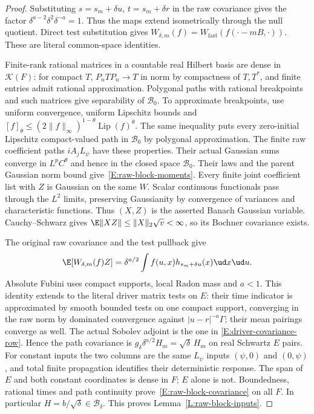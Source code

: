 \begin{proof}
  Substituting $s=s_m+\delta u$, $t=s_m+\delta r$ in the raw
  covariance gives the factor
  $\delta^{a-2}\delta^2\delta^{-a}=1$.
  Thus the maps extend isometrically through the null quotient.
  Direct test substitution gives
  $W_{\delta,m}(f)=W_{\mathrm{fast}}(f(\cdot-mB,\cdot))$.
  These are literal common-space identities.

  Finite-rank rational matrices in a countable real Hilbert basis
  are dense in $\mathcal K(F)$: for compact $T$,
  $P_nTP_n\to T$ in norm by compactness of $T,T^*$, and finite
  entries admit rational approximation. Polygonal paths with rational
  breakpoints and such matrices give separability of $\mathscr B_0$.
  To approximate breakpoints, use uniform convergence, uniform
  Lipschitz bounds and
  $[f]_\theta\le(2\|f\|_\infty)^{1-\theta}\operatorname{Lip}(f)^\theta$.
  The same inequality puts every zero-initial Lipschitz
  compact-valued path in $\mathscr B_0$ by polygonal approximation.
  The finite raw coefficient paths $iA_jL_\psi$ have these properties.
  Their actual Gaussian sums converge in $L^pC^\theta$ and hence
  in the closed space $\mathscr B_0$. Their laws and the parent
  Gaussian norm bound give~\eqref{E:raw-block-moments}.
  Every finite joint coefficient list with $Z$ is Gaussian on the
  same $W$. Scalar continuous functionals pass through the $L^2$
  limits, preserving Gaussianity by convergence of variances and
  characteristic functions. Thus $(X,Z)$ is the asserted Banach
  Gaussian variable. Cauchy--Schwarz gives
  $\E\|XZ\|\le\|X\|_2\sqrt v<\infty$, so its Bochner covariance exists.

  The original raw covariance and the test pullback give
  \begin{equation}\label{E:raw-block-mean-jacobian}
    \E[W_{\delta,m}(f)Z]
    =\delta^{a/2}\int f(u,x)h_{s_m+\delta u}(x)\ud x\ud u.
  \end{equation}
  Absolute Fubini uses compact supports, local Radon mass and $a<1$.
  This identity extends to the literal driver matrix tests on $E$:
  their time indicator is approximated by smooth bounded tests on one
  compact support, converging in the raw norm by dominated convergence
  against $|u-r|^{-a}\Gamma$; their mean pairings converge as well.
  The actual Sobolev adjoint is the one in
  \eqref{E:driver-covariance-row}. Hence the path covariance is
  $g_\delta\delta^{a/2}H_m=\sqrt\delta\,H_m$ on real Schwartz
  $E$ pairs. For constant inputs the two columns are the same
  $L_\psi$ inputs $(\psi,0)$ and $(0,\psi)$, and total finite
  propagation identifies their deterministic response.
  The span of $E$ and both constant coordinates is dense in $F$;
  $E$ alone is not. Boundedness, rational times and path continuity
  prove~\eqref{E:raw-block-covariance} on all $F$.
  In particular $H=b/\sqrt\delta\in\mathscr B_\delta$.
  This proves Lemma~\ref{L:raw-block-inputs}.
\end{proof}

